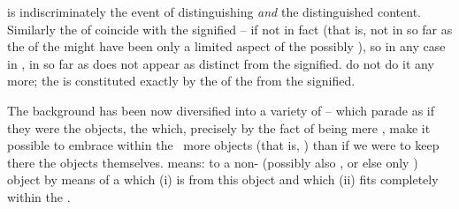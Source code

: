 
\pa\label{pas:signsMean}
 is indiscriminately the event of distinguishing {\em and} the
distinguished content. Similarly
the  of  coincide with the signified -- if not in
fact (that is, not in so far as the  of the  might have
been only a limited aspect of the possibly ), so in
any case in , in so far as  does not appear as distinct
from the signified.  do not do it any more; the  is constituted exactly by the  of the  from the
signified.

The background has been now diversified into a variety of 
--  which parade as if they were the objects, the  which, precisely by the fact of being mere , make it
possible to embrace within the \hoa\ more objects (that is, ) than if
we were to keep there the objects themselves.   means: to
 a non- (possibly also , or else only
) object by means of a 
 which (i) is  from this object and which (ii) fits
completely within the \hoa.

